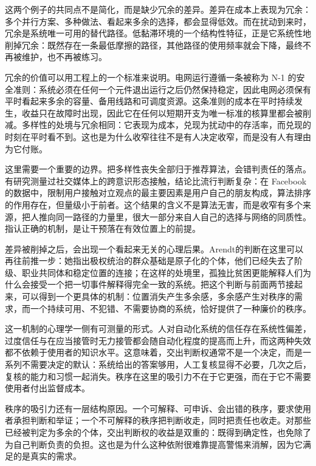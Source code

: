 这两个例子的共同点不是简化，而是缺少冗余的差异。差异在成本上表现为冗余：多个并行方案、多种做法、看起来多余的选择，都会显得低效。而在扰动到来时，冗余是系统唯一可用的替代路径。低黏滞环境的一个结构性特征，正是它系统性地削掉冗余：既然存在一条最低摩擦的路径，其他路径的使用频率就会下降，最终不再被维护，也不再被练习。

冗余的价值可以用工程上的一个标准来说明。电网运行遵循一条被称为 N-1 的安全准则：系统必须在任何一个元件退出运行之后仍然保持稳定，因此电网必须保有平时看起来多余的容量、备用线路和可调度资源\cite{morison2004power}。这条准则的成本在平时持续发生，收益只在故障时出现，因此它在任何以短期开支为唯一标准的核算里都会被削减。多样性的处境与冗余相同：它表现为成本，兑现为扰动中的存活率，而兑现的时刻在平时看不到。这也是为什么收窄往往不是有人决定收窄，而是没有人有理由为它付账。

这里需要一个重要的边界。把多样性丧失全部归于推荐算法，会错判责任的落点。有研究测量过社交媒体上的跨意识形态接触，结论比流行判断复杂：在 Facebook 的数据中，限制用户接触对立观点的最主要因素是用户自己的朋友构成，算法排序的作用存在，但量级小于前者\cite{bakshy2015exposure}。这个结果的含义不是算法无害，而是收窄有多个来源，把人推向同一路径的力量里，很大一部分来自人自己的选择与网络的同质性。指认正确的机制，是让干预落在有效位置上的前提。


差异被削掉之后，会出现一个看起来无关的心理后果。Arendt的判断在这里可以再往前推一步：她指出极权统治的群众基础是原子化的个体，他们已经失去了阶级、职业共同体和稳定位置的连接；在这样的处境里，孤独比贫困更能解释人们为什么会接受一个把一切事件解释得完全一致的系统\cite{arendt1951origins}。把这个判断与前面两节接起来，可以得到一个更具体的机制：位置消失产生多余感，多余感产生对秩序的需求，而一个持续可用、不犯错、不需要协商的系统，恰好提供了一种廉价的秩序。

这一机制的心理学一侧有可测量的形式。人对自动化系统的信任存在系统性偏差，过度信任与在应当接管时无力接管都会随自动化程度的提高而上升，而这两种失效都不依赖于使用者的知识水平\cite{parasuraman1997humans}。这意味着，交出判断权通常不是一个决定，而是一系列不需要决定的默认：系统给出的答案够用，人工复核显得不必要，几次之后，复核的能力和习惯一起消失。秩序在这里的吸引力不在于它更强，而在于它不需要使用者付出监督成本。

秩序的吸引力还有一层结构原因。一个可解释、可申诉、会出错的秩序，要求使用者承担判断和举证；一个不可解释的秩序把判断收走，同时把责任也收走。对那些已经被判定为多余的个体，交出判断权的收益是双重的：既得到确定性，也免除了为自己判断负责的负担。这也是为什么这种依附很难靠提高警惕来消解，因为它满足的是真实的需求。


